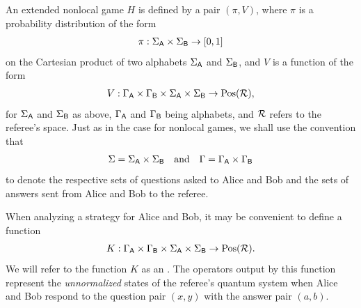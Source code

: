 An extended nonlocal game $H$ is defined by a pair $(\pi,V)$, where $\pi$ is a probability distribution of the form 
\begin{align}
	\pi : \Sigma_{\mathsf{A}} \times \Sigma_{\mathsf{B}} \rightarrow \left[0,1\right]
\end{align}
on the Cartesian product of two alphabets $\Sigma_{\mathsf{A}}$ and $\Sigma_{\mathsf{B}}$, and $V$ is a function of the form 
\begin{align}
	V : \Gamma_{\mathsf{A}} \times \Gamma_{\mathsf{B}} \times \Sigma_{\mathsf{A}} \times \Sigma_{\mathsf{B}} \rightarrow \mathrm{Pos}(\mathcal{R}), 
\end{align}
for $\Sigma_{\mathsf{A}}$ and $\Sigma_{\mathsf{B}}$ as above, $\Gamma_{\mathsf{A}}$ and $\Gamma_{\mathsf{B}}$ being alphabets, and $\mathcal{R}$ refers to the referee's space. Just as in the case for nonlocal games, we shall use the convention that
\begin{align}
	\Sigma = \Sigma_{\mathsf{A}} \times \Sigma_{\mathsf{B}} \quad \textnormal{and} \quad \Gamma = \Gamma_{\mathsf{A}} \times \Gamma_{\mathsf{B}}
\end{align}
to denote the respective sets of questions asked to Alice and Bob and the sets of answers sent from Alice and Bob to the referee. 

When analyzing a strategy for Alice and Bob, it may be convenient to define a function 
\begin{align}
	K : \Gamma_{\mathsf{A}} \times \Gamma_{\mathsf{B}} \times \Sigma_{\mathsf{A}} \times \Sigma_{\mathsf{B}} \rightarrow \mathrm{Pos}(\mathcal{R}).
\end{align}
We will refer to the function $K$ as an . The operators output by this function represent the \emph{unnormalized} states of the referee's quantum system when Alice and Bob respond to the question pair $(x,y)$ with the answer pair $(a,b)$. 


